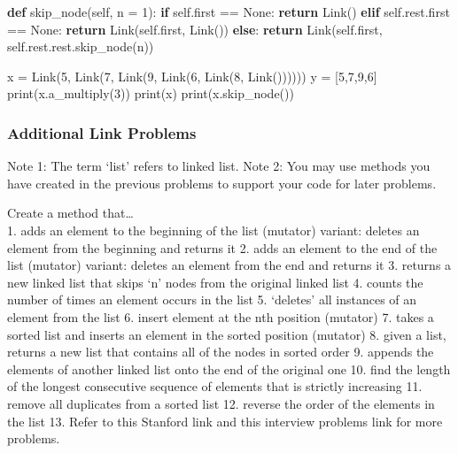 \documentclass[11pt]{article}
\newenvironment{Shaded}{}{}
\newcommand{\KeywordTok}[1]{\textcolor[rgb]{0.00,0.44,0.13}{\textbf{{#1}}}}
\newcommand{\DecValTok}[1]{\textcolor[rgb]{0.25,0.63,0.44}{{#1}}}
\newcommand{\NormalTok}[1]{{#1}}
\newcommand{\VariableTok}[1]{\textcolor[rgb]{0.10,0.09,0.49}{{#1}}}
\newcommand{\ControlFlowTok}[1]{\textcolor[rgb]{0.00,0.44,0.13}{\textbf{{#1}}}}
\newcommand{\OperatorTok}[1]{\textcolor[rgb]{0.40,0.40,0.40}{{#1}}}
\newcommand{\BuiltInTok}[1]{{#1}}
\begin{document}
\begin{Shaded}
\begin{Highlighting}[]
    \KeywordTok{def}\NormalTok{ skip_node(}\VariableTok{self}\NormalTok{, n }\OperatorTok{=} \DecValTok{1}\NormalTok{):}
        \ControlFlowTok{if} \VariableTok{self}\NormalTok{.first }\OperatorTok{==} \VariableTok{None}\NormalTok{:}
            \ControlFlowTok{return}\NormalTok{ Link()}
        \ControlFlowTok{elif} \VariableTok{self}\NormalTok{.rest.first }\OperatorTok{==} \VariableTok{None}\NormalTok{:}
            \ControlFlowTok{return}\NormalTok{ Link(}\VariableTok{self}\NormalTok{.first, Link())}
        \ControlFlowTok{else}\NormalTok{:}
            \ControlFlowTok{return}\NormalTok{ Link(}\VariableTok{self}\NormalTok{.first, }\VariableTok{self}\NormalTok{.rest.rest.skip_node(n))}
        
        
\NormalTok{x }\OperatorTok{=}\NormalTok{ Link(}\DecValTok{5}\NormalTok{, Link(}\DecValTok{7}\NormalTok{, Link(}\DecValTok{9}\NormalTok{, Link(}\DecValTok{6}\NormalTok{, Link(}\DecValTok{8}\NormalTok{, Link())))))}
\NormalTok{y }\OperatorTok{=}\NormalTok{ [}\DecValTok{5}\NormalTok{,}\DecValTok{7}\NormalTok{,}\DecValTok{9}\NormalTok{,}\DecValTok{6}\NormalTok{]}
\BuiltInTok{print}\NormalTok{(x.a_multiply(}\DecValTok{3}\NormalTok{))}
\BuiltInTok{print}\NormalTok{(x)}
\BuiltInTok{print}\NormalTok{(x.skip_node())}
\end{Highlighting}
\end{Shaded}

\subsubsection{Additional Link Problems}\label{additional-link-problems}

Note 1: The term `list' refers to linked list. Note 2: You may use
methods you have created in the previous problems to support your code
for later problems.

Create a method that\ldots{}\\
1. adds an element to the beginning of the list (mutator) variant:
deletes an element from the beginning and returns it 2. adds an element
to the end of the list (mutator) variant: deletes an element from the
end and returns it 3. returns a new linked list that skips `n' nodes
from the original linked list 4. counts the number of times an element
occurs in the list 5. `deletes' all instances of an element from the
list 6. insert element at the nth position (mutator) 7. takes a sorted
list and inserts an element in the sorted position (mutator) 8. given a
list, returns a new list that contains all of the nodes in sorted order
9. appends the elements of another linked list onto the end of the
original one 10. find the length of the longest consecutive sequence of
elements that is strictly increasing 11. remove all duplicates from a
sorted list 12. reverse the order of the elements in the list 13. Refer
to this Stanford link and this interview problems link for more
problems.
\end{document}
